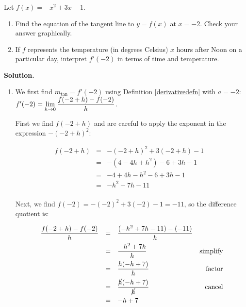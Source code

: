 \documentclass{ximera}
\begin{document}
\begin{example}  \label{tangentlineex}  Let $f(x) = -x^2 + 3x-1$.  

\begin{enumerate}

\item Find the equation of the tangent line to $y = f(x)$ at $x = -2$.  Check your answer graphically.

\item  If $f$ represents the temperature (in degrees Celsius) $x$ hours after Noon on a particular day, interpret $f'(-2)$ in terms of time and temperature.

\end{enumerate}

\bigskip

{\bf Solution.}  \begin{enumerate} \item We first find $m_{\text{tan}} = f'(-2)$ using Definition \ref{derivativedefn} with $a = -2$:  $ f'(-2) = \ds{\lim_{h \rightarrow 0} \dfrac{f(-2+h) - f(-2)}{h}}$. 

First we find $f(-2+h)$ and are  careful to apply the exponent in the expression $-(-2+h)^2$:

\[ \begin{array}{rclr}  
  f(-2+h) & = & -(-2+h)^2 +3(-2+h) -1 & \\ 
  & = & - (4 - 4h+h^2) -6+3h-1 & \\
 & = & -4 + 4h-h^2-6+3h-1& \\
  & = & -h^2+7h-11& \\
 \end{array} \]

Next, we find $f(-2) = -(-2)^2 + 3(-2)-1 = -11$, so the difference quotient is:

\[ \begin{array}{rclr}

\dfrac{f(-2+h)-f(-2)}{h} & = & \dfrac{(-h^2+7h-11) -(-11)}{h} & \\[8pt]
                                & = & \dfrac{-h^2+7h}{h} & \text{simplify}\\[8pt]
                                & = &  \dfrac{h(-h+7)}{h} & \text{factor} \\[8pt]
                                & = &  \dfrac{\cancel{h}(-h+7)}{\cancel{h}} &  \text{cancel} \\[8pt]
                                & = & -h+7\\ \end{array} \]




\end{enumerate}
\end{example}
\end{document}
